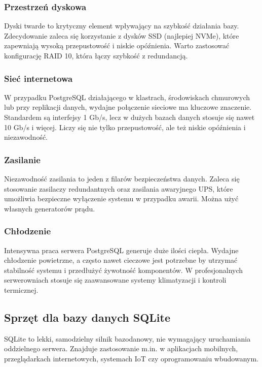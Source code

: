 \documentclass[letterpaper,10pt,polish]{sphinxmanual}
\begin{document}
\subsubsection{Przestrzeń dyskowa}
\label{\detokenize{rozdzial2/Sprzet-dla-bazy-danych/source/SprzetDlaBazyDanych:przestrzen-dyskowa}}
\sphinxAtStartPar
Dyski twarde to krytyczny element wpływający na szybkość działania bazy. Zdecydowanie zaleca się korzystanie z dysków SSD (najlepiej NVMe), które zapewniają wysoką przepustowość i niskie opóźnienia. Warto zastosować konfigurację RAID 10, która łączy szybkość z redundancją.


\subsubsection{Sieć internetowa}
\label{\detokenize{rozdzial2/Sprzet-dla-bazy-danych/source/SprzetDlaBazyDanych:siec-internetowa}}
\sphinxAtStartPar
W przypadku PostgreSQL działającego w klastrach, środowiskach chmurowych lub przy replikacji danych, wydajne połączenie sieciowe ma kluczowe znaczenie. Standardem są interfejsy 1 Gb/s, lecz w dużych bazach danych stosuje się nawet 10 Gb/s i więcej. Liczy się nie tylko przepustowość, ale też niskie opóźnienia i niezawodność.


\subsubsection{Zasilanie}
\label{\detokenize{rozdzial2/Sprzet-dla-bazy-danych/source/SprzetDlaBazyDanych:zasilanie}}
\sphinxAtStartPar
Niezawodność zasilania to jeden z filarów bezpieczeństwa danych. Zaleca się stosowanie zasilaczy redundantnych oraz zasilania awaryjnego UPS, które umożliwia bezpieczne wyłączenie systemu w przypadku awarii. Można użyć własnych generatorów prądu.


\subsubsection{Chłodzenie}
\label{\detokenize{rozdzial2/Sprzet-dla-bazy-danych/source/SprzetDlaBazyDanych:chlodzenie}}
\sphinxAtStartPar
Intensywna praca serwera PostgreSQL generuje duże ilości ciepła. Wydajne chłodzenie powietrzne, a często nawet cieczowe jest potrzebne by utrzymać stabilność systemu i przedłużyć żywotność komponentów. W profesjonalnych serwerowniach stosuje się zaawansowane systemy klimatyzacji i kontroli termicznej.


\subsection{Sprzęt dla bazy danych SQLite}
\label{\detokenize{rozdzial2/Sprzet-dla-bazy-danych/source/SprzetDlaBazyDanych:sprzet-dla-bazy-danych-sqlite}}
\sphinxAtStartPar
SQLite to lekki, samodzielny silnik bazodanowy, nie wymagający uruchamiania oddzielnego serwera. Znajduje zastosowanie m.in. w aplikacjach mobilnych, przeglądarkach internetowych, systemach IoT czy oprogramowaniu wbudowanym.
\end{document}
